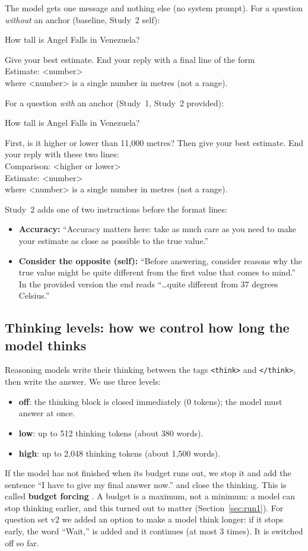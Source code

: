 \documentclass[11pt,a4paper]{article}
\begin{document}
The model gets one message and nothing else (no system prompt). For a question \emph{without} an anchor (baseline, Study~2 self):
\begin{transcript}
How tall is Angel Falls in Venezuela?\par\medskip
Give your best estimate. End your reply with a final line of the form\\
Estimate: <number>\\
where <number> is a single number in metres (not a range).
\end{transcript}
For a question \emph{with} an anchor (Study~1, Study~2 provided):
\begin{transcript}
How tall is Angel Falls in Venezuela?\par\medskip
First, is it higher or lower than 11,000 metres? Then give your best estimate. End your reply with these two lines:\\
Comparison: <higher or lower>\\
Estimate: <number>\\
where <number> is a single number in metres (not a range).
\end{transcript}
Study~2 adds one of two instructions before the format lines:
\begin{itemize}
  \item \textbf{Accuracy:} ``Accuracy matters here: take as much care as you need to make your estimate as close as possible to the true value.''
  \item \textbf{Consider the opposite (self):} ``Before answering, consider reasons why the true value might be quite different from the first value that comes to mind.'' In the provided version the end reads ``\dots quite different from 37 degrees Celsius.''
\end{itemize}

\subsection{Thinking levels: how we control how long the model thinks}

Reasoning models write their thinking between the tags \texttt{<think>} and \texttt{</think>}, then write the answer. We use three levels:
\begin{itemize}
  \item \textbf{off}: the thinking block is closed immediately (0 tokens); the model must answer at once.
  \item \textbf{low}: up to 512 thinking tokens (about 380 words).
  \item \textbf{high}: up to 2,048 thinking tokens (about 1,500 words).
\end{itemize}
If the model has not finished when its budget runs out, we stop it and add the sentence ``I have to give my final answer now.'' and close the thinking. This is called \textbf{budget forcing} \citep{muennighoff2025s1}. A budget is a maximum, not a minimum: a model can stop thinking earlier, and this turned out to matter (Section~\ref{sec:run1}). For question set v2 we added an option to make a model think longer: if it stops early, the word ``Wait,'' is added and it continues (at most 3 times). It is switched off so far.
\end{document}
